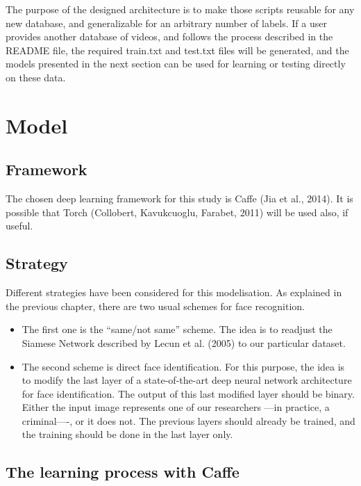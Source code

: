 The purpose of the designed architecture is to make those scripts reusable for any new database, and generalizable for an arbitrary number of labels. If a user provides another database of videos, and follows the process described in the README file, the required train.txt and test.txt files will be generated, and the models presented in the next section can be used for learning or testing directly on these data.

\section{Model}

\subsection{Framework}
The chosen deep learning framework for this study is Caffe (Jia et al., 2014). It is possible that Torch (Collobert, Kavukcuoglu, Farabet, 2011) will be used also, if useful.\\

\subsection{Strategy}
Different strategies have been considered for this modelisation. As explained in the previous chapter, there are two usual schemes for face recognition.
\begin{itemize}
\item The first one is the \enquote{same/not same} scheme. The idea is to readjust the Siamese Network described by Lecun et al. (2005) to our particular dataset.\newline
\item The second scheme is direct face identification. For this purpose, the idea is to modify the last layer of a state-of-the-art deep neural network architecture for face identification. The output of this last modified layer should be binary. Either the input image represents one of our researchers ---in practice, a criminal----, or it does not. The previous layers should already be trained, and the training should be done in the last layer only.
\end{itemize}
\subsection{The learning process with Caffe}

